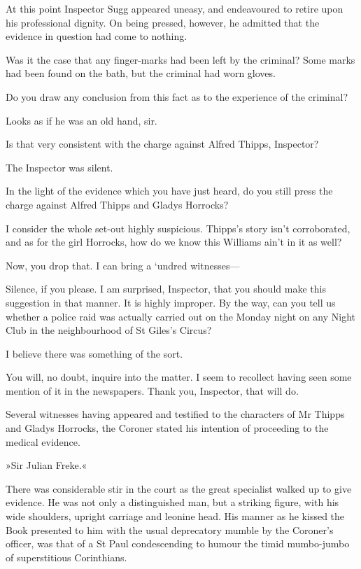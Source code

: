 At this point Inspector Sugg appeared uneasy, and endeavoured to retire upon his professional dignity. On being pressed, however, he admitted that the evidence in question had come to nothing.

\begin{dialogue}
 Was it the case that any finger-marks had been left by the criminal?
Some marks had been found on the bath, but the criminal had worn gloves.

 Do you draw any conclusion from this fact as to the experience of the criminal?

 Looks as if he was an old hand, sir.

 Is that very consistent with the charge against Alfred Thipps, Inspector?

The Inspector was silent.

 In the light of the evidence which you have just heard, do you still press the charge against Alfred Thipps and Gladys Horrocks?

 I consider the whole set-out highly suspicious. Thipps's story isn't corroborated, and as for the girl Horrocks, how do we know this Williams ain't in it as well?

 Now, you drop that. I can bring a `undred witnesses—

 Silence, if you please. I am surprised, Inspector, that you should make this suggestion in that manner. It is highly improper. By the way, can you tell us whether a police raid was actually carried out on the Monday night on any Night Club in the neighbourhood of St Giles's Circus?

  I believe there was something of the sort.

 You will, no doubt, inquire into the matter. I seem to recollect having seen some mention of it in the newspapers. Thank you, Inspector, that will do.
\end{dialogue}

Several witnesses having appeared and testified to the characters of Mr Thipps and Gladys Horrocks, the Coroner stated his intention of proceeding to the medical evidence.

»Sir Julian Freke.«

There was considerable stir in the court as the great specialist walked up to give evidence. He was not only a distinguished man, but a striking figure, with his wide shoulders, upright carriage and leonine head. His manner as he kissed the Book presented to him with the usual deprecatory mumble by the Coroner's officer, was that of a St Paul condescending to humour the timid mumbo-jumbo of superstitious Corinthians.

